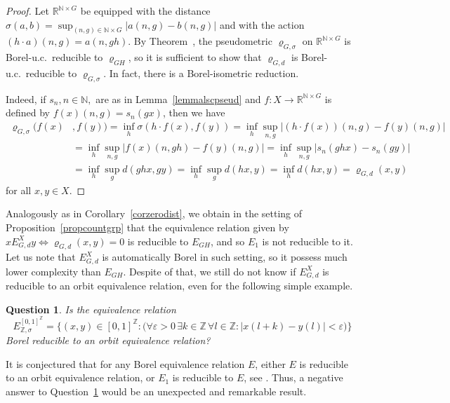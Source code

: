 \documentclass[a4paper]{amsart}
\theoremstyle{plain}
\newtheorem{question}[theorem]{Question}
\theoremstyle{remark}
\begin{document}
\begin{proof}
Let $ \mathbb{R}^{\mathbb{N} \times G} $ be equipped with the distance $ \sigma(a, b) = \sup_{(n, g) \in \mathbb{N} \times G} |a(n, g) - b(n, g)| $ and with the action $ (h \cdot a)(n, g) = a(n, gh) $. By Theorem~, the pseudometric $ \varrho_{G, \sigma} $ on $ \mathbb{R}^{\mathbb{N} \times G} $ is Borel-u.c.~reducible to $ \varrho_{GH} $, so it is sufficient to show that $ \varrho_{G, d} $ is Borel-u.c.~reducible to $ \varrho_{G, \sigma} $. In fact, there is a Borel-isometric reduction.
	
Indeed, if $ s_{n}, n \in \mathbb{N}, $ are as in Lemma~\ref{lemmalscpseud} and $ f : X \to \mathbb{R}^{\mathbb{N} \times G} $ is defined by $ f(x)(n, g) = s_{n}(gx) $, then we have
\begin{align*}
\varrho_{G, \sigma}(f(x) & , f(y)) = \inf_{h} \sigma(h \cdot f(x), f(y)) = \inf_{h} \sup_{n, g} \big| (h \cdot f(x))(n, g) - f(y)(n, g) \big| \\
 & = \inf_{h} \sup_{n, g} \big| f(x)(n, gh) - f(y)(n, g) \big| = \inf_{h} \sup_{n, g} \big| s_{n}(ghx) - s_{n}(gy) \big| \\
 & = \inf_{h} \sup_{g} d(ghx, gy) = \inf_{h} \sup_{g} d(hx, y) = \inf_{h} d(hx, y) = \varrho_{G, d}(x, y)
\end{align*}
for all $ x, y \in X $.
\end{proof}	


Analogously as in Corollary~\ref{corzerodist}, we obtain in the setting of Proposition~\ref{propcountgrp} that the equivalence relation given by $ x E^{X}_{G, d} y \Leftrightarrow \varrho_{G, d}(x, y) = 0 $ is reducible to $ E_{GH} $, and so $ E_{1} $ is not reducible to it. Let us note that $ E^{X}_{G, d} $ is automatically Borel in such setting, so it possess much lower complexity than $ E_{GH} $. Despite of that, we still do not know if $ E^{X}_{G, d} $ is reducible to an orbit equivalence relation, even for the following simple example.


\begin{question} \label{question2}
Is the equivalence relation
$$ E^{[0, 1]^{\mathbb{Z}}}_{\mathbb{Z}, \sigma} = \big\{ (x, y) \in [0, 1]^{\mathbb{Z}} : \big( \forall \varepsilon > 0 \, \exists k \in \mathbb{Z} \, \forall l \in \mathbb{Z} : |x(l+k) - y(l)| < \varepsilon \big) \big\} $$
Borel reducible to an orbit equivalence relation?
\end{question}


It is conjectured that for any Borel equivalence relation $ E $, either $ E $ is reducible to an orbit equivalence relation, or $ E_{1} $ is reducible to $ E $, see \cite[Conjecture~1]{hjokech}. Thus, a negative answer to Question~\ref{question2} would be an unexpected and remarkable result.
\end{document}
